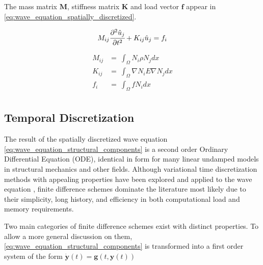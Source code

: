 The mass matrix $\mathbf M$, stiffness matrix $\mathbf K$ and load vector $\mathbf f$ appear in \ref{eq:wave_equation_spatially_discretized}.

\begin{equation} \label{eq:wave_equation_structural_components}
M_{ij} \cfrac{\partial^2 \hat u_j}{\partial t^2}
+
K_{ij} \hat u_j
=
f_i
\end{equation}

\begin{equation} \label{eq:structural_components}
	\begin{array}{rl}
		M_{ij} &= \ \int_{\Omega} N_i \rho N_j dx \\
		K_{ij} &= \ \int_{\Omega} \nabla N_i E \nabla N_j dx \\
		f_{i}  &= \ \int_{\Omega} f N_i dx \\
	\end{array}
\end{equation}

\subsection*{Temporal Discretization}
\label{subsection:wave_equation_temporal_discretization}

The result of the spatially discretized wave equation \ref{eq:wave_equation_structural_components} is a second order Ordinary Differential Equation (ODE), identical in form for many linear undamped models in structural mechanics and other fields. Although variational time discretization methods with appealing properties have been explored \cite{Zhao2014} and applied to the wave equation \cite{Kocher2014}, finite difference schemes dominate the literature most likely due to their simplicity, long history, and efficiency in both computational load and memory requirements.

Two main categories of finite difference schemes exist with distinct properties. To allow a more general discussion on them, \ref{eq:wave_equation_structural_components} is transformed into a first order system of the form $\dot{\mathbf y}(t) = \mathbf g(t, \mathbf y(t))$

